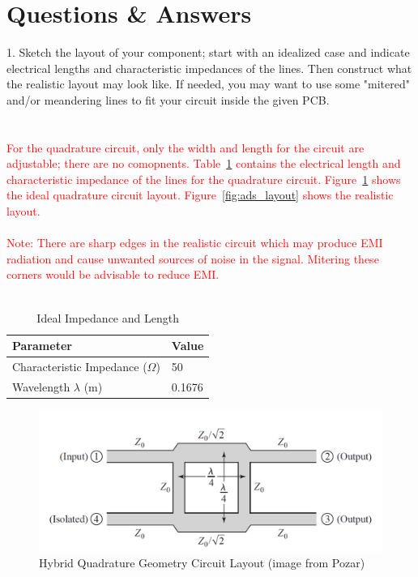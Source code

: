 \documentclass[conference]{IEEEtran}
\begin{document}
\section{Questions \& Answers}
1. Sketch the layout of your component; start with an idealized case and indicate electrical lengths and characteristic impedances of the lines. Then construct what the realistic layout may look like. If needed, you may want to use some "mitered" and/or meandering lines to fit your circuit inside the given PCB.\\\\\\
\textcolor{red}{For the quadrature circuit, only the width and length for the circuit are adjustable; there are no comopnents.  Table~\ref{tab:layout} contains the electrical length and characteristic impedance of the lines for the quadrature circuit.  Figure~\ref{fig:pozar_hybrid} shows the ideal quadrature circuit layout.  Figure~\ref{fig:ads_layout} shows the realistic layout.\\\\
Note: There are sharp edges in the realistic circuit which may produce EMI radiation and cause unwanted sources of noise in the signal.  Mitering these corners would be advisable to reduce EMI.}\\\\
\begin{table}[!h]
    \centering
    \caption{Ideal Impedance and Length}
    \begin{tabular}{|l|l|}
    
        \hline
        Parameter                         & Value  \\ \hline
        Characteristic Impedance ($\Omega$) & 50     \\  \hline
        Wavelength $\lambda$ (m)          & 0.1676 \\
        \hline
    \end{tabular}
\label{tab:layout}
\end{table}

\begin{figure}[!h]
\centering
\includegraphics[scale=0.25]{pozar-hybrid.png}
\caption{Hybrid Quadrature Geometry Circuit Layout (image from Pozar)}
\label{fig:pozar_hybrid}
\end{figure}
\end{document}
